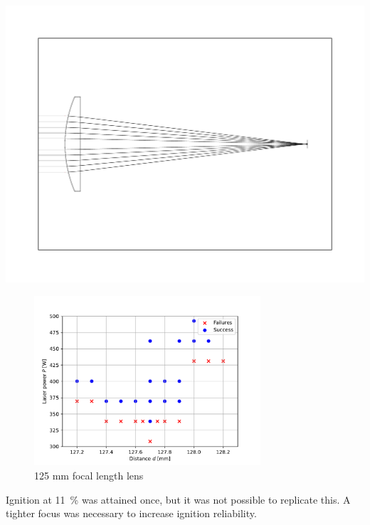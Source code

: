             \includegraphics[width=\textwidth]{assets/5 results/125lens.pdf}

            \begin{figure}[h]
                \centering
                \includegraphics[width=0.75\textwidth]{assets/5 results/125mm_focus_threshold.pdf}
                \caption{125 mm focal length lens}
            \end{figure}
            
            Ignition at \qty{11}{\%} was attained once, but it was not possible to replicate this. A tighter focus was necessary to increase ignition reliability.

